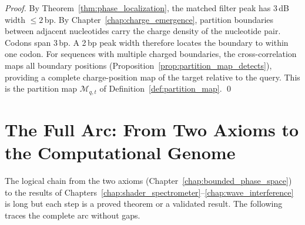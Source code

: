 \begin{proof}
By Theorem~\ref{thm:phase_localization}, the matched filter peak has 3\,dB
width $\leq 2$\,bp. By Chapter~\ref{chap:charge_emergence}, partition boundaries
between adjacent nucleotides carry the charge density of the nucleotide pair.
Codons span 3\,bp. A 2\,bp peak width therefore locates the boundary to within
one codon. For sequences with multiple charged boundaries, the cross-correlation
maps all boundary positions (Proposition~\ref{prop:partition_map_detects}),
providing a complete charge-position map of the target relative to the query.
This is the partition map $\mathcal{M}_{q,t}$ of Definition~\ref{def:partition_map}. \qed
\end{proof}

\section{The Full Arc: From Two Axioms to the Computational Genome}
\label{sec:full_arc}

The logical chain from the two axioms (Chapter~\ref{chap:bounded_phase_space})
to the results of Chapters~\ref{chap:shader_spectrometer}--\ref{chap:wave_interference}
is long but each step is a proved theorem or a validated result. The following
traces the complete arc without gaps.

